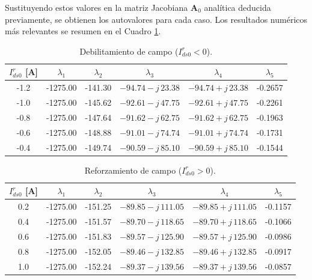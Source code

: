 \documentclass[12pt, a4paper,journal, onecolumn, compsoc]{IEEEtran}
\begin{document}
Sustituyendo estos valores en la matriz Jacobiana $\mathbf{A}_0$ analítica deducida previamente, se obtienen los autovalores para cada caso. Los resultados numéricos más relevantes se resumen en el Cuadro \ref{tab:migracion_polos}.


\begin{table}[H]
\centering
\caption{Debilitamiento de campo ($I_{ds0}^r<0$).}
\label{tab:migracion_polos}
\begin{tabular}{|c|c|c|c|c|c|}
\hline
$I_{ds0}^r$ [A] & $\lambda_1$ & $\lambda_2$ & $\lambda_3$ & $\lambda_4$ & $\lambda_5$ \\
\hline
-1.2 & -1275.00 & -141.30 & $-94.74 - j\,23.38$ & $-94.74 + j\,23.38$ & -0.2657 \\
-1.0 & -1275.00 & -145.62 & $-92.61 - j\,47.75$ & $-92.61 + j\,47.75$ & -0.2261 \\
-0.8 & -1275.00 & -147.64 & $-91.62 - j\,62.75$ & $-91.62 + j\,62.75$ & -0.1963 \\
-0.6 & -1275.00 & -148.88 & $-91.01 - j\,74.74$ & $-91.01 + j\,74.74$ & -0.1731 \\
-0.4 & -1275.00 & -149.74 & $-90.59 - j\,85.10$ & $-90.59 + j\,85.10$ & -0.1544 \\
\hline
\end{tabular}
\end{table}

\begin{table}[H]
\centering
\caption{Reforzamiento de campo ($I_{ds0}^r>0$).}
\label{tab:migracion_polos_reforzamiento}
\begin{tabular}{|c|c|c|c|c|c|}
\hline
$I_{ds0}^r$ [A] & $\lambda_1$ & $\lambda_2$ & $\lambda_3$ & $\lambda_4$ & $\lambda_5$ \\
\hline
0.2 & -1275.00 & -151.25 & $-89.85 - j\,111.05$ & $-89.85 + j\,111.05$ & -0.1157 \\
0.4 & -1275.00 & -151.57 & $-89.70 - j\,118.65$ & $-89.70 + j\,118.65$ & -0.1066 \\
0.6 & -1275.00 & -151.83 & $-89.57 - j\,125.90$ & $-89.57 + j\,125.90$ & -0.0986 \\
0.8 & -1275.00 & -152.05 & $-89.46 - j\,132.85$ & $-89.46 + j\,132.85$ & -0.0917 \\
1.0 & -1275.00 & -152.24 & $-89.37 - j\,139.56$ & $-89.37 + j\,139.56$ & -0.0857 \\
\hline
\end{tabular}
\end{table}
\end{document}
